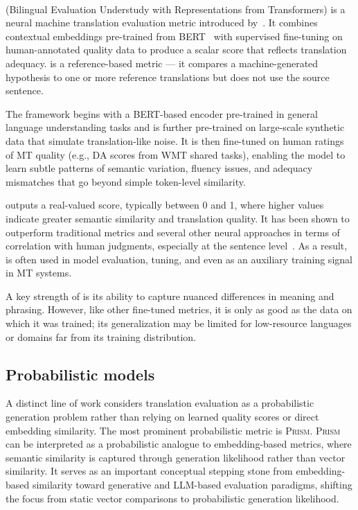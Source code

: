 \noindent\paragraph{\bleurt} (Bilingual Evaluation Understudy with Representations from Transformers) is a neural machine translation evaluation metric introduced by~\citet{sellam-etal-2020-bleurt}. It combines contextual embeddings pre-trained from BERT~\citep{bert} with supervised fine-tuning on human-annotated quality data to produce a scalar score that reflects translation adequacy. \bleurt is a reference-based metric --- it compares a machine-generated hypothesis to one or more reference translations but does not use the source sentence.

The \bleurt framework begins with a BERT-based encoder pre-trained in general language understanding tasks and is further pre-trained on large-scale synthetic data that simulate translation-like noise. It is then fine-tuned on human ratings of MT quality (e.g., DA scores from WMT shared tasks), enabling the model to learn subtle patterns of semantic variation, fluency issues, and adequacy mismatches that go beyond simple token-level similarity.

\bleurt outputs a real-valued score, typically between 0 and 1, where higher values indicate greater semantic similarity and translation quality. It has been shown to outperform traditional metrics and several other neural approaches in terms of correlation with human judgments, especially at the sentence level~\citep{sellam-etal-2020-bleurt}. As a result, \bleurt is often used in model evaluation, tuning, and even as an auxiliary training signal in MT systems.

A key strength of \bleurt is its ability to capture nuanced differences in meaning and phrasing. However, like other fine-tuned metrics, it is only as good as the data on which it was trained; its generalization may be limited for low-resource languages or domains far from its training distribution.

\subsection{Probabilistic models}
A distinct line of work considers translation evaluation as a probabilistic generation problem rather than relying on learned quality scores or direct embedding similarity. The most prominent probabilistic metric is \textsc{Prism}.
\textsc{Prism} can be interpreted as a probabilistic analogue to embedding-based metrics, where semantic similarity is captured through generation likelihood rather than vector similarity.  It serves as an important conceptual stepping stone from embedding-based similarity toward generative and LLM-based evaluation paradigms, shifting the focus from static vector comparisons to probabilistic generation likelihood.

